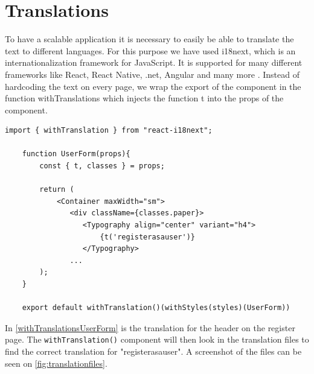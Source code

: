 \section{Translations}
To have a scalable application it is necessary to easily be able to translate the text to different languages.
For this purpose we have used i18next, which is an internationalization framework for JavaScript.
It is supported for many different frameworks like React, React Native, .net, Angular and many more \cite{react-i18next}.
Instead of hardcoding the text on every page, we wrap the export of the component in the function withTranslations which injects the function t into the props of the component.  

\begin{lstlisting}[caption={Translated header when registering as a user.}, captionpos=b, label={withTranslationsUserForm}]
    import { withTranslation } from "react-i18next";

    function UserForm(props){
        const { t, classes } = props;

        return (
            <Container maxWidth="sm">
               <div className={classes.paper}>
                  <Typography align="center" variant="h4">
                      {t('registerasauser')}
                  </Typography>
               ...
        );
    }

    export default withTranslation()(withStyles(styles)(UserForm))
\end{lstlisting}
\noindent
In \autoref{withTranslationsUserForm} is the translation for the header on the register page.
The \texttt{withTranslation()} component will then look in the translation files to find the correct translation for "registerasauser". 
A screenshot of the files can be seen on \autoref{fig:translationfiles}.
